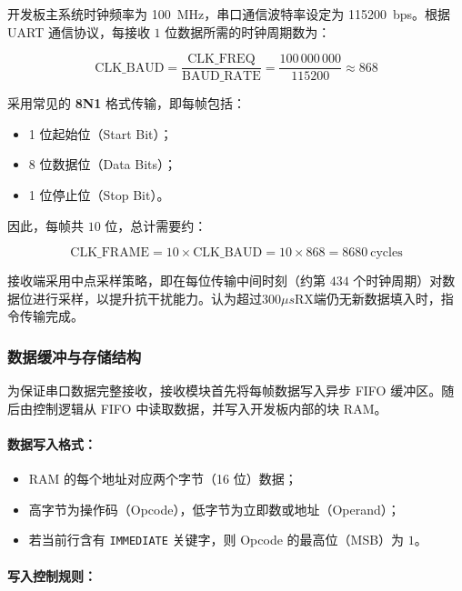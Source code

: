 \documentclass[lang=cn,a4paper,newtx]{elegantpaper}
\begin{document}
开发板主系统时钟频率为 \SI{100}{\mega\hertz}，串口通信波特率设定为 \SI{115200}{bps}。根据 UART 通信协议，每接收 $1$ 位数据所需的时钟周期数为：

\begin{equation}
  \text{CLK\_BAUD} = \frac{\text{CLK\_FREQ}}{\text{BAUD\_RATE}} = \frac{100\,000\,000}{115200} \approx 868
\end{equation}

采用常见的 \textbf{8N1} 格式传输，即每帧包括：

\begin{itemize}
  \item 1 位起始位（Start Bit）；
  \item 8 位数据位（Data Bits）；
  \item 1 位停止位（Stop Bit）。
\end{itemize}

因此，每帧共 $10$ 位，总计需要约：

\begin{equation}
  \text{CLK\_FRAME} = 10 \times \text{CLK\_BAUD} = 10 \times 868 = 8680\ \text{cycles}
\end{equation}

接收端采用中点采样策略，即在每位传输中间时刻（约第 $434$ 个时钟周期）对数据位进行采样，以提升抗干扰能力。认为超过300$\mu s$RX端仍无新数据填入时，指令传输完成。

\subsubsection{数据缓冲与存储结构}

为保证串口数据完整接收，接收模块首先将每帧数据写入异步 FIFO 缓冲区。随后由控制逻辑从 FIFO 中读取数据，并写入开发板内部的块 RAM。

\paragraph{数据写入格式：}

\begin{itemize}
  \item RAM 的每个地址对应两个字节（16 位）数据；
  \item 高字节为操作码（Opcode），低字节为立即数或地址（Operand）；
  \item 若当前行含有 \texttt{IMMEDIATE} 关键字，则 Opcode 的最高位（MSB）为 $1$。
\end{itemize}

\paragraph{写入控制规则：}
\end{document}
